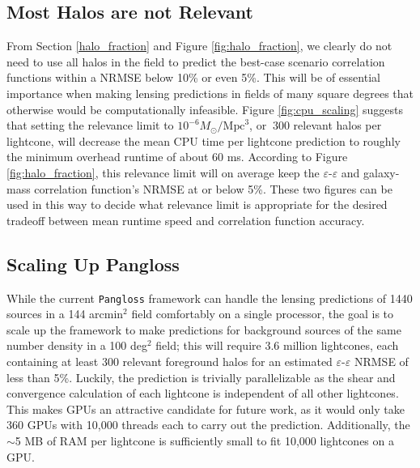 \documentclass[%
 reprint,
 amsmath,amssymb,
 aps,nofootinbib
]{revtex4-1}
\begin{document}
\subsection{Most Halos are not Relevant}

From Section \ref{halo_fraction} and Figure \ref{fig:halo_fraction}, we clearly do not need to use all halos in the field to predict the best-case scenario correlation functions within a NRMSE below 10\% or even 5\%. This will be of essential importance when making lensing predictions in fields of many square degrees that otherwise would be computationally infeasible. Figure \ref{fig:cpu_scaling} suggests that setting the relevance limit to ${10^{-6}M_\odot/\text{Mpc}^3}$, or $~300$ relevant halos per lightcone, will decrease the mean CPU time per lightcone prediction to roughly the minimum overhead runtime of about 60 ms. According to Figure \ref{fig:halo_fraction}, this relevance limit will on average keep the $\varepsilon$-$\varepsilon$ and galaxy-mass correlation function's NRMSE at or below 5\%. These two figures can be used in this way to decide what relevance limit is appropriate for the desired tradeoff between mean runtime speed and correlation function accuracy. 


\subsection{Scaling Up Pangloss} \label{scaling_up}

While the current \texttt{Pangloss} framework can handle the lensing predictions of 1440 sources in a 144 arcmin$^2$ field comfortably on a single processor, the goal is to scale up the framework to make predictions for background sources of the same number density in a 100 deg$^2$ field; this will require 3.6 million lightcones, each containing at least 300 relevant foreground halos for an estimated $\varepsilon$-$\varepsilon$ NRMSE of less than 5\%. Luckily, the prediction is trivially parallelizable as the shear and convergence calculation of each lightcone is independent of all other lightcones. This makes GPUs an attractive candidate for future work, as it would only take 360 GPUs with 10,000 threads each to carry out the prediction. Additionally, the $\sim$5 MB of RAM per lightcone is sufficiently small to fit 10,000 lightcones on a GPU.
\end{document}
